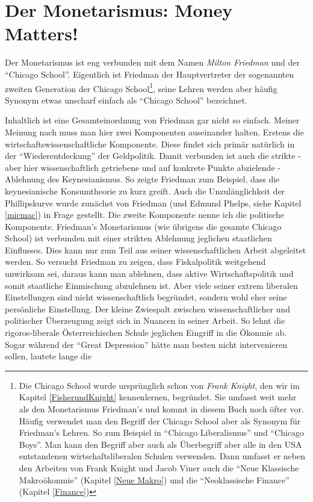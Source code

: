 %
%
%

\chapter{Der Monetarismus: Money Matters!}
\label{Monetarismus}

Der Monetarismus ist eng verbunden mit dem Namen \textit{Milton Friedman} und der "`Chicago School"'. Eigentlich ist Friedman der Hauptvertreter der sogenannten zweiten Generation der Chicago School\footnote{Die Chicago School wurde ursprünglich schon von \textit{Frank Knight}, den wir im Kapitel \ref{FisherundKnight} kennenlernen, begründet. Sie umfasst weit mehr als den Monetarismus Friedman's und kommt in diesem Buch noch öfter vor. Häufig verwendet man den Begriff der Chicago School aber als Synonym für Friedman's Lehren. So zum Beispiel in "`Chicago Liberalismus"' und "`Chicago Boys"'. Man kann den Begriff aber auch als Überbegriff aber alle in den USA entstandenen wirtschaftsliberalen Schulen verwenden. Dann umfasst er neben den Arbeiten von Frank Knight und Jacob Viner auch die "`Neue Klassische Makroökonmie"' (Kapitel \ref{Neue Makro}) und die "`Neoklassische Finance"' (Kapitel \ref{Finance})}, seine Lehren werden aber häufig Synonym etwas unscharf einfach als "`Chicago School"' bezeichnet. 

Inhaltlich ist eine Gesamteinordnung von Friedman gar nicht so einfach. Meiner Meinung nach muss man hier zwei Komponenten auseinander halten. Erstens die wirtschaftswissenschaftliche Komponente. Diese findet sich primär natürlich in der "`Wiederentdeckung"' der Geldpolitik. Damit verbunden ist auch die strikte - aber hier wissenschaftlich getriebene und auf konkrete Punkte abzielende - Ablehnung des Keynesianismus. So zeigte Friedman zum Beispiel, dass die keynesianische Konsumtheorie zu kurz greift. Auch die Unzulänglichkeit der Phillipskurve wurde zunächst von Friedman (und Edmund Phelps, siehe Kapitel \ref{micmac}) in Frage gestellt.
Die zweite Komponente nenne ich die politische Komponente. Friedman's Monetarismus (wie übrigens die gesamte Chicago School) ist verbunden mit einer strikten Ablehnung jeglichen staatlichen Einflusses. Dies kann nur zum Teil aus seiner wissenschaftlichen Arbeit abgeleitet werden. So versucht Friedman zu zeigen, dass Fiskalpolitik weitgehend unwirksam sei, daraus kann man ablehnen, dass aktive Wirtschaftspolitik und somit staatliche Einmischung abzulehnen ist. Aber viele seiner extrem liberalen Einstellungen sind nicht wissenschaftlich begründet, sondern wohl eher seine persönliche Einstellung.
Der kleine Zwiespalt zwischen wissenschaftlicher und politischer Überzeugung zeigt sich in Nuancen in seiner Arbeit. So lehnt die rigoros-liberale Österreichischen Schule jeglichen Eingriff in die Ökonmie ab. Sogar während der "`Great Depression"' hätte man besten nicht intervenieren sollen, lautete lange die



